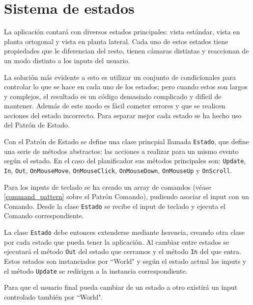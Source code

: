 
\section{Sistema de estados}
\label{state_pattern}
La aplicación contará con diversos estados principales: vista estándar, vista en planta ortogonal y vista en planta lateral. Cada uno de estos estados tiene propiedades que le diferencian del resto, tienen cámaras distintas y reaccionan de un modo distinto a los inputs del usuario.

La solución más evidente a esto es utilizar un conjunto de condicionales para controlar lo que se hace en cada uno de los estados; pero cuando estos son largos y complejos, el resultado es un código demasiado complicado y difícil de mantener. Además de este modo es fácil cometer errores y que se realicen acciones del estado incorrecto. Para separar mejor cada estado se ha hecho uso del Patrón de Estado.

Con el Patrón de Estado se define una clase princpial llamada \texttt{Estado}, que define una serie de métodos abstractos: las acciones a realizar para un mismo evento según el estado. En el caso del planificador sus métodos principales son: \texttt{Update}, \texttt{In}, \texttt{Out}, \texttt{OnMouseMove}, \texttt{OnMouseClick}, \texttt{OnMouseDown}, \texttt{OnMouseUp} y \texttt{OnScroll}.

Para los inputs de teclado se ha creado un array de comandos (véase \ref{command_pattern} sobre el Patrón Comando), pudiendo asociar el input con un Comando. Desde la clase \texttt{Estado} se recibe el input de teclado y ejecuta el Comando correspondiente.

La clase \texttt{Estado} debe entonces extenderse mediante herencia, creando otra clase por cada estado que pueda tener la aplicación. Al cambiar entre estados se ejecutará el método \texttt{Out} del estado que cerramos y el método \texttt{In} del que entra. Estos estados son instanciados por ``World" y según el estado actual los inputs y el método \texttt{Update} se redirigen a la instancia correspondiente.

Para que el usuario final pueda cambiar de un estado a otro existirá un input controlado también por ``World".

